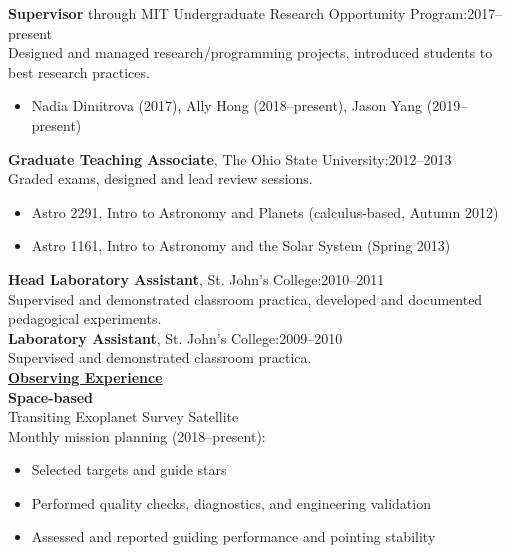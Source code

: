 \documentclass[letterpaper,11pt]{article}
\begin{document}
\textbf{Supervisor} through MIT Undergraduate Research Opportunity Program:\hfill2017--present\\
\indent Designed and managed research/programming projects, introduced students to \\
\indent best research practices.
\begin{itemize}[nosep,label=\textbullet]
\item Nadia Dimitrova (2017), Ally Hong (2018--present), Jason Yang (2019--present)
\end{itemize}\textbf{Graduate Teaching Associate}, The Ohio State University:\hfill2012--2013\\
\indent Graded exams, designed and lead review sessions.
\begin{itemize}[nosep, label=\textbullet]
\item Astro 2291,  Intro to Astronomy and Planets (calculus-based, Autumn 2012)
\item Astro 1161,  Intro to Astronomy and the Solar System (Spring 2013)
\end{itemize}
\textbf{Head Laboratory Assistant}, St. John's College:\hfill2010--2011\\
\indent Supervised and demonstrated classroom practica, developed and documented\\
 \indent  pedagogical experiments.\\
\textbf{Laboratory Assistant}, St. John's College:\hfill2009--2010\\
\indent Supervised and demonstrated classroom practica.\\
\clearpage
\noindent \underline{\textbf{Observing Experience}}\\
\textbf{Space-based}\\
Transiting Exoplanet Survey Satellite\\
\indent Monthly mission planning (2018--present):
\begin{itemize}[nosep,label=\textbullet]
\item Selected targets and guide stars
\item Performed quality checks, diagnostics, and engineering validation
\item Assessed and reported guiding performance and pointing stability
\end{itemize}
\end{document}
